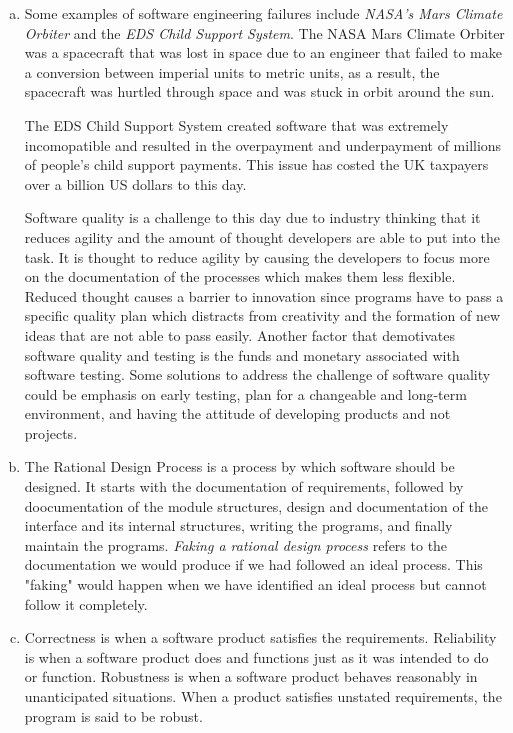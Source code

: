 \documentclass[12pt]{article}
\begin{document}
\begin{enumerate}[(a)]
\item Some examples of software engineering failures include \textit{NASA's Mars Climate Orbiter} and the \textit{EDS Child Support System}. The NASA Mars Climate Orbiter was a spacecraft that was lost in space due to an engineer that failed to make a conversion between imperial units to metric units, as a result, the spacecraft was hurtled through space and was stuck in orbit around the sun.

        The EDS Child Support System created software that was extremely incomopatible and resulted in the overpayment and underpayment of millions of people's child support payments. This issue has costed the UK taxpayers over a billion US dollars to this day.

        Software quality is a challenge to this day due to industry thinking that it reduces agility and the amount of thought developers are able to put into the task. It is thought to reduce agility by causing the developers to focus more on the documentation of the processes which makes them less flexible. Reduced thought causes a barrier to innovation since programs have to pass a specific quality plan which distracts from creativity and the formation of new ideas that are not able to pass easily. Another factor that demotivates software quality and testing is the funds and monetary associated with software testing. Some solutions to address the challenge of software quality could be emphasis on early testing, plan for a changeable and long-term environment, and having the attitude of developing products and not projects.\\

\item The Rational Design Process is a process by which software should be designed. It starts with the documentation of requirements, followed by doocumentation of the module structures, design and documentation of the interface and its internal structures, writing the programs, and finally maintain the programs. \textit{Faking a rational design process} refers to the documentation we would  produce if we had followed an ideal process. This "faking" would happen when we have identified an ideal process but cannot follow it completely.\\

\item Correctness is when a software product satisfies the requirements. Reliability is when a software product does and functions just as it was intended to do or function. Robustness is when a software product behaves reasonably in unanticipated situations. When a product satisfies unstated requirements, the program is said to be robust.\\


\end{enumerate}
\end{document}
